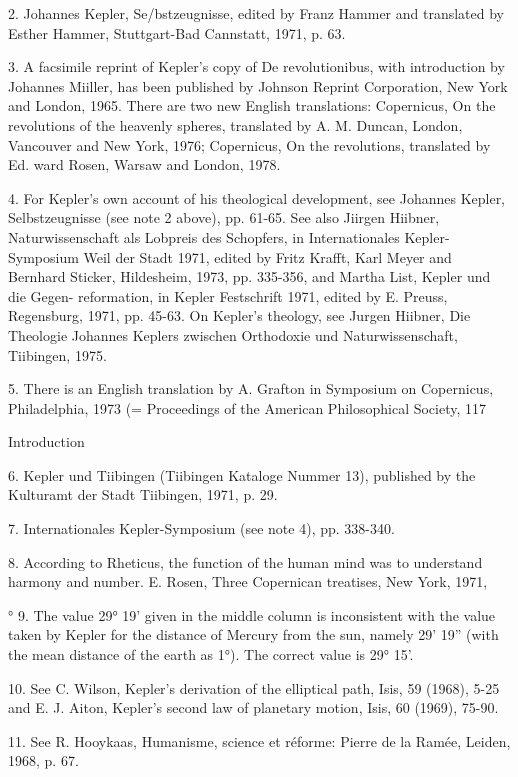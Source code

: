 \documentclass{article}
\begin{document}
2. Johannes Kepler, Se/bstzeugnisse, edited by Franz Hammer and translated by
Esther Hammer, Stuttgart-Bad Cannstatt, 1971, p. 63.

3. A facsimile reprint of Kepler’s copy of De revolutionibus, with introduction
by Johannes Miiller, has been published by Johnson Reprint Corporation, New
York and London, 1965. There are two new English translations: Copernicus, On
the revolutions of the heavenly spheres, translated by A. M. Duncan, London,
Vancouver and New York, 1976; Copernicus, On the revolutions, translated by Ed.
ward Rosen, Warsaw and London, 1978.

4. For Kepler’s own account of his theological development, see Johannes
Kepler, Selbstzeugnisse (see note 2 above), pp. 61-65. See also Jiirgen Hiibner,
Naturwissenschaft als Lobpreis des Schopfers, in Internationales Kepler-
Symposium Weil der Stadt 1971, edited by Fritz Krafft, Karl Meyer and Bernhard
Sticker, Hildesheim, 1973, pp. 335-356, and Martha List, Kepler und die Gegen-
reformation, in Kepler Festschrift 1971, edited by E. Preuss, Regensburg, 1971,
pp. 45-63. On Kepler’s theology, see Jurgen Hiibner, Die Theologie Johannes
Keplers zwischen Orthodoxie und Naturwissenschaft, Tiibingen, 1975.

5. There is an English translation by A. Grafton in Symposium on Copernicus,
Philadelphia, 1973 (= Proceedings of the American Philosophical Society, 117


Introduction

6. Kepler und Tiibingen (Tiibingen Kataloge Nummer 13), published by the
Kulturamt der Stadt Tiibingen, 1971, p. 29.

7. Internationales Kepler-Symposium (see note 4), pp. 338-340.

8. According to Rheticus, the function of the human mind was to understand
harmony and number. E. Rosen, Three Copernican treatises, New York, 1971,

° 9. The value 29° 19’ given in the middle column is inconsistent with the value
taken by Kepler for the distance of Mercury from the sun, namely 29’ 19” (with the
mean distance of the earth as 1°). The correct value is 29° 15’.

10. See C. Wilson, Kepler’s derivation of the elliptical path, Isis, 59 (1968), 5-25
and E. J. Aiton, Kepler’s second law of planetary motion, Isis, 60 (1969), 75-90.

11. See R. Hooykaas, Humanisme, science et réforme: Pierre de la Ramée,
Leiden, 1968, p. 67.
\end{document}
